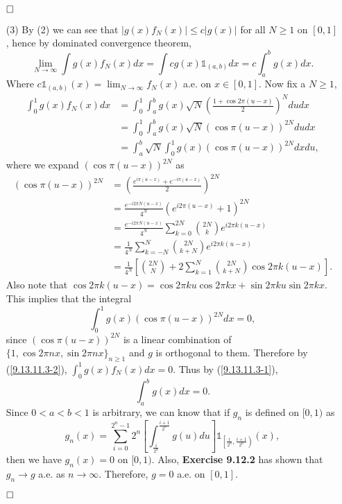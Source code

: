 \documentclass[12pt]{extarticle}
\begin{document}
\begin{enumerate}
$\hspace{\fill}\square$
\item[(3)] By (2) we can see that $|g(x)f_N(x)|\leq c|g(x)|$ for all $N\geq 1$ on $[0,1]$, hence by dominated convergence theorem,
\begin{equation}
\lim_{N\rightarrow\infty}\int g(x)f_N(x)dx=\int cg(x)\mathds{1}_{(a,b)}dx=c\int_a^bg(x)dx.
\label{9.13.11.3-1}
\end{equation}
Where $c\mathds{1}_{(a,b)}(x)=\lim_{N\rightarrow\infty}f_N(x)$ a.e. on $x\in[0,1]$. Now fix a $N\geq 1$,
\begin{equation}
\begin{aligned}
\int_0^1g(x)f_N(x)dx &= \int_0^1\int_a^b g(x)\sqrt{N}\left(\frac{1+\cos 2\pi(u-x)}{2}\right)^N dudx
\\&
=\int_0^1\int_a^b g(x)\sqrt{N}\left(\cos \pi(u-x)\right)^{2N} dudx
\\&
=\int_a^b\sqrt{N}\int_0^1 g(x)(\cos \pi(u-x))^{2N} dxdu,
\end{aligned}
\label{9.13.11.3-2}
\end{equation}
where we expand $(\cos \pi(u-x))^{2N}$ as
\[
\begin{aligned}
(\cos \pi(u-x))^{2N} &= \left(\frac{e^{i\pi(u-x)}+e^{-i\pi(u-x)}}{2}\right)^{2N}
\\&
= \frac{e^{-i2\pi N(u-x)}}{4^N}(e^{i2\pi(u-x)}+1)^{2N}
\\&
= \frac{e^{-i2\pi N(u-x)}}{4^N}\sum_{k=0}^{2N}\binom{2N}{k}e^{i2\pi k(u-x)}
\\&
= \frac{1}{4^N}\sum_{k=-N}^{N}\binom{2N}{k+N}e^{i2\pi k(u-x)}
\\&
= \frac{1}{4^N}
\left[
\binom{2N}{N}+2\sum_{k=1}^N\binom{2N}{k+N}\cos 2\pi k(u-x)
\right].
\end{aligned}
\]
Also note that $\cos 2\pi k(u-x)=\cos 2\pi ku\cos 2\pi kx+\sin 2\pi ku\sin 2\pi kx$. This implies that the integral
\[
\int_0^1 g(x)(\cos \pi(u-x))^{2N}dx=0,
\]
since $(\cos \pi(u-x))^{2N}$ is a linear combination of $\{1, \cos 2\pi nx, \sin 2\pi nx\}_{n\geq 1}$ and $g$ is orthogonal to them. Therefore by (\ref{9.13.11.3-2}), $\int_0^1 g(x)f_N(x)dx=0$. Thus by (\ref{9.13.11.3-1}),
\[
\int_a^bg(x)dx=0.
\]
Since $0<a<b<1$ is arbitrary, we can know that if $g_n$ is defined on $[0,1)$ as
\[
g_n(x)=\sum_{i=0}^{2^n-1}2^n\left[\int_\frac{i}{2^n}^\frac{i+1}{2^n}g(u)du\right]\mathds{1}_{\left[\frac{i}{2^n},\frac{i+1}{2^n}\right)}(x),
\]
then we have $g_n(x)=0$ on $[0,1)$. Also, \textbf{Exercise 9.12.2} has shown that $g_n\rightarrow g$ a.e. as $n\rightarrow\infty$. Therefore, $g=0$ a.e. on $[0,1]$.

$\hspace{\fill}\square$
\end{enumerate}
\end{document}
